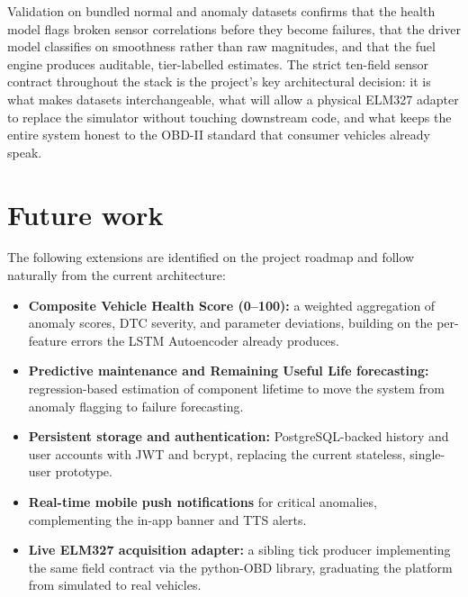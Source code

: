 \documentclass[10pt,a4paper]{report}
\begin{document}
Validation on bundled normal and anomaly datasets confirms that the health model flags broken sensor correlations before they become failures, that the driver model classifies on smoothness rather than raw magnitudes, and that the fuel engine produces auditable, tier-labelled estimates. The strict ten-field sensor contract throughout the stack is the project's key architectural decision: it is what makes datasets interchangeable, what will allow a physical ELM327 adapter to replace the simulator without touching downstream code, and what keeps the entire system honest to the OBD-II standard that consumer vehicles already speak.

\section{Future work}

The following extensions are identified on the project roadmap and follow naturally from the current architecture:
\begin{itemize}
  \item \textbf{Composite Vehicle Health Score (0--100):} a weighted aggregation of anomaly scores, DTC severity, and parameter deviations, building on the per-feature errors the LSTM Autoencoder already produces.
  \item \textbf{Predictive maintenance and Remaining Useful Life forecasting:} regression-based estimation of component lifetime to move the system from anomaly flagging to failure forecasting.
  \item \textbf{Persistent storage and authentication:} PostgreSQL-backed history and user accounts with JWT and bcrypt, replacing the current stateless, single-user prototype.
  \item \textbf{Real-time mobile push notifications} for critical anomalies, complementing the in-app banner and TTS alerts.
  \item \textbf{Live ELM327 acquisition adapter:} a sibling tick producer implementing the same field contract via the python-OBD library, graduating the platform from simulated to real vehicles.
\end{itemize}

\pagestyle{plain}
\renewcommand{\bibname}{References}


\printbibliography




\appendix
\end{document}

